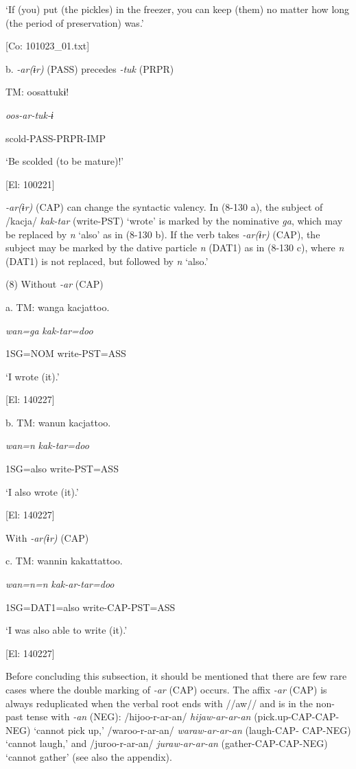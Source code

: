     ‘If (you) put (the pickles) in the freezer, you can keep (them) no matter how long (the period of preservation) was.’

    [Co: 101023\_01.txt]

  b. \textit{{}-ar(ɨr)} (PASS) precedes \textit{{}-tuk} (PRPR)

  TM:  oosattukɨ!

    \textit{oos-ar-tuk{}-ɨ}

    scold-PASS-PRPR-IMP

    ‘Be scolded (to be mature)!’

    [El: 100221]

  \textit{{}-ar(ɨr)} (CAP) can change the syntactic valency. In (8-130 a), the subject of /kacja/ \textit{kak-tar} (write-PST) ‘wrote’ is marked by the nominative \textit{ga}, which may be replaced by \textit{n} ‘also’ as in (8-130 b). If the verb takes \textit{{}-ar(ɨr)} (CAP), the subject may be marked by the dative particle \textit{n} (DAT1) as in (8-130 c), where \textit{n} (DAT1) is not replaced, but followed by \textit{n} ‘also.’

(8)  Without \textit{{}-ar} (CAP)

  a.  TM:  wanga  kacjattoo.

      \textit{wan=ga}  \textit{kak-tar=doo}

      1SG=NOM  write-PST=ASS

      ‘I wrote (it).’

      [El: 140227]

  b.  TM:  wanun  kacjattoo.

      \textit{wan=n}  \textit{kak-tar=doo}

      1SG=also  write-PST=ASS

      ‘I also wrote (it).’

      [El: 140227]

  With \textit{{}-ar(ɨr)} (CAP)

  c.  TM:  wannin  kakattattoo.

      \textit{wan=n=n}  \textit{kak-ar-tar=doo}

      1SG=DAT1=also  write-CAP-PST=ASS

      ‘I was also able to write (it).’

      [El: 140227]

  Before concluding this subsection, it should be mentioned that there are few rare cases where the double marking of \textit{{}-ar} (CAP) occurs. The affix \textit{{}-ar} (CAP) is always reduplicated when the verbal root ends with //aw// and is in the non-past tense with \textit{-an} (NEG): /hijoo-r-ar-an/ \textit{hijaw-ar-ar-an} (pick.up-CAP-CAP-NEG) ‘cannot pick up,’ /waroo-r-ar-an/ \textit{waraw-ar-ar-an} (laugh-CAP- CAP-NEG) ‘cannot laugh,’ and /juroo-r-ar-an/ \textit{juraw-ar-ar-an} (gather-CAP-CAP-NEG) ‘cannot gather’ (see also the appendix).

